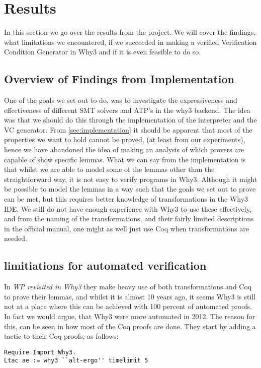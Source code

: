 \section{Results}\label{sec:results}
In this section we go over the results from the project.
We will cover the findings,
what limitations we encountered,
if we succeeded in making a verified Verification Condition Generator in Why3 and if it is even feasible to do so.

\subsection{Overview of Findings from Implementation}
One of the goals we set out to do, was to investigate the expressiveness and effectiveness of different SMT solvers and ATP's in the why3 backend.
The idea was that we should do this through the implementation of the interpreter and the VC generator.
From \ref{sec:implementation} it should be apparent that most of the properties we want to hold cannot be proved, (at least from our experiments),
hence we have abandoned the idea of making an analysis of which provers are capable of show specific lemmas.
What we can say from the implementation is that whilst we are able to model some of the lemmas other than the straightforward way,
it is not easy to verify programs in Why3.
Although it might be possible to model the lemmas in a way such that the goals we set out to prove can be met,
but this requires better knowledge of transformations in the Why3 IDE.
We still do not have enough experience with Why3 to use these effectively, and from the naming of the transformations, and their fairly limited descriptions in the official manual, one might as well just use Coq when transformations are needed.

\subsection{limitiations for automated verification}
In \textit{WP revisited in Why3} they make heavy use of both transformations and Coq to prove their lemmas,
and whilst it is almost 10 years ago, it seems Why3 is still not at a place where this can be achieved with 100 percent of automated proofs. In fact we would argue, that Why3 were more automated in 2012. The reason for this, can be seen in how most of the Coq proofs are done.
They start by adding a tactic to their Coq proofs, as follows:

\begin{lstlisting}
Require Import Why3.
Ltac ae := why3 ``alt-ergo'' timelimit 5
\end{lstlisting}


